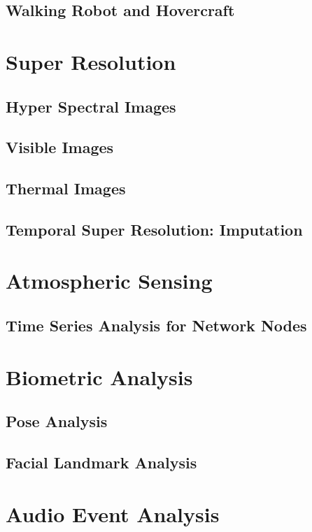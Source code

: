 \documentclass[doublespacing]{utdthesis}
\begin{document}
\section{Walking Robot and Hovercraft}
\label{s:wr}

\chapter{Super Resolution}
\label{c:super resolution}
\section{Hyper Spectral Images}
\label{s:sr with hsi}
\section{Visible Images}
\label{s:sr with visible}
\section{Thermal Images}
\label{s:sr with thermal}
\section{Temporal Super Resolution: Imputation}
\label{s:sr with time}

\chapter{Atmospheric Sensing}
\label{c:atmospheric sensing}
\section{Time Series Analysis for Network Nodes}
\label{s:time series}


\chapter{Biometric Analysis}
\label{c:biometrics}
\section{Pose Analysis}
\label{s:pose}
\section{Facial Landmark Analysis}
\label{s:face}

\chapter{Audio Event Analysis}
\label{c: Audio}
\end{document}
